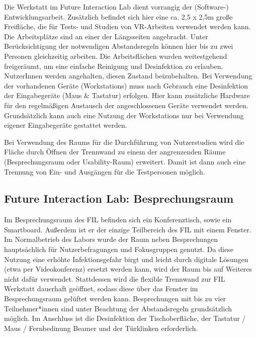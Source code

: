 
\noindent
Die Werkstatt im Future Interaction Lab dient vorrangig der (Software-) Entwicklungsarbeit. Zusätzlich befindet sich hier eine ca. 2,5 x 2,5m große Freifläche, die für Tests- und Studien von VR-Arbeiten verwendet werden kann. Die Arbeitsplätze sind an einer der Längsseiten angebracht. Unter Berücksichtigung der notwendigen Abstandsregeln können hier bis zu zwei Personen gleichzeitig arbeiten.
Die Arbeitsflächen wurden weitestgehend freigeräumt, um eine einfache Reinigung und Desinfektion zu erlauben.
NutzerInnen werden angehalten, diesen Zustand beizubehalten. Bei Verwendung der vorhandenen Geräte (Workstations) muss nach Gebrauch eine Desinfektion der Eingabegeräte (Maus \& Tastatur) erfolgen. Hier kann zusätzliche Hardware für den regelmäßigen Austausch der angeschlossenen Geräte verwendet werden. Grundsätzlich kann auch eine Nutzung der Workstations nur bei Verwendung eigener Eingabegeräte gestattet werden.

\medskip
\noindent
Bei Verwendung des Raums für die Durchführung von Nutzerstudien wird die Fläche  durch Öffnen der Trennwand zu einem der angrenzenden Räume (Besprechungsraum oder Usability-Raum) erweitert. Damit ist dann auch eine Trennung von Ein- und Ausgängen für die Testpersonen möglich.

\subsection{Future Interaction Lab: Besprechungsraum}\label{subsec:labore_fil_besprechungsraum}


\noindent
Im Besprechungsraum des FIL befinden sich ein Konferenztisch, sowie ein Smartboard.
Außerdem ist er der einzige Teilbereich des FIL mit einem Fenster. Im Normalbetrieb des Labors wurde der Raum neben Besprechungen hauptsächlich für Nutzerbefragungen und Fokusgruppen genutzt. Da diese Nutzung eine erhöhte Infektionsgefahr birgt und leicht durch digitale Lösungen (etwa per Videokonferenz) ersetzt werden kann, wird der Raum bis auf Weiteres nicht dafür verwendet.
Stattdessen wird die flexible Trennwand zur FIL Werkstatt dauerhaft geöffnet, sodass diese über das Fenster im Besprechungsraum gelüftet werden kann. Besprechungen mit bis zu vier Teilnehmer*innen sind unter Beachtung der Abstandsregeln grundsätzlich möglich. Im Anschluss ist die Desinfektion der Tischoberfläche, der Tastatur / Maus / Fernbedinung Beamer und der Türklinken erforderlich.

